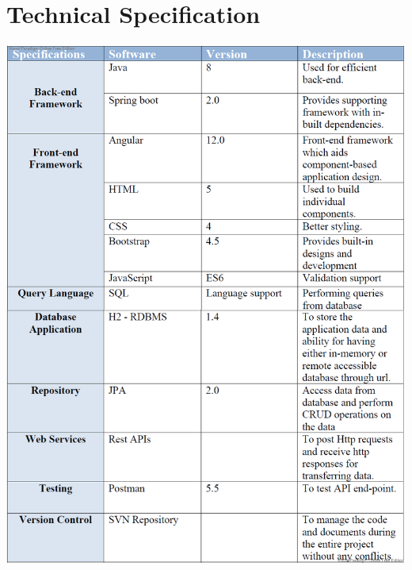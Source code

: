 \section{ Technical Specification}
\begin{center}
    \includegraphics[scale=0.3]{images/techspecs.png}
    
\end{center}
